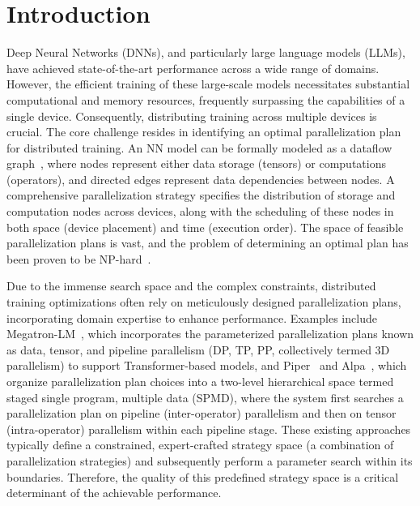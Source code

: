 \section{Introduction}
\label{sec:intro}

Deep Neural Networks (DNNs), and particularly large language models (LLMs), have achieved state-of-the-art performance across a wide range of domains. However, the efficient training of these large-scale models necessitates substantial computational and memory resources, frequently surpassing the capabilities of a single device. Consequently, distributing training across multiple devices is crucial. The core challenge resides in identifying an optimal parallelization plan for distributed training. An NN model can be formally modeled as a dataflow graph~\cite{lin2023songc}, where nodes represent either data storage (tensors) or computations (operators), and directed edges represent data dependencies between nodes. A comprehensive parallelization strategy specifies the distribution of storage and computation nodes across devices, along with the scheduling of these nodes in both space (device placement) and time (execution order). The space of feasible parallelization plans is vast, and the problem of determining an optimal plan has been proven to be NP-hard~\cite{liu2024aceso}.

Due to the immense search space and the complex constraints, distributed training optimizations often rely on meticulously designed parallelization plans, incorporating domain expertise to enhance performance. Examples include Megatron-LM~\cite{shoeybi2019megatron, narayanan2021efficient}, which incorporates the parameterized parallelization plans known as data, tensor, and pipeline parallelism (DP, TP, PP, collectively termed 3D parallelism) to support Transformer-based models, and Piper~\cite{tarnawski2021piper} and Alpa~\cite{zheng2022alpa}, which organize parallelization plan choices into a two-level hierarchical space termed staged single program, multiple data (SPMD), where the system first searches a parallelization plan on pipeline (inter-operator) parallelism and then on tensor (intra-operator) parallelism within each pipeline stage. These existing approaches typically define a constrained, expert-crafted strategy space (a combination of parallelization strategies) and subsequently perform a parameter search within its boundaries. Therefore, the quality of this predefined strategy space is a critical determinant of the achievable performance.

